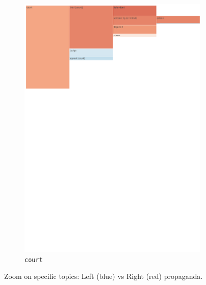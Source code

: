\begin{figure}[!htbp]
{\begin{subfigure}{0.49\textwidth}
		\includegraphics[trim={0.15cm 19.5cm 5cm 0.15cm},clip,width=\linewidth]{figures/baly_iptc_weighted_prop_total_leaning_diff_zoom_court.pdf}
		\caption{\texttt{court}}
            \label{fig:baly_iptc_weighted_prop_total_leaning_diff_zoom_court}
	\end{subfigure}}
	
    \caption{Zoom on specific topics: Left (blue) vs Right (red) propaganda.}
    \label{fig:baly_iptc_weighted_prop_total_leaning_diff_zoom}
\end{figure}

